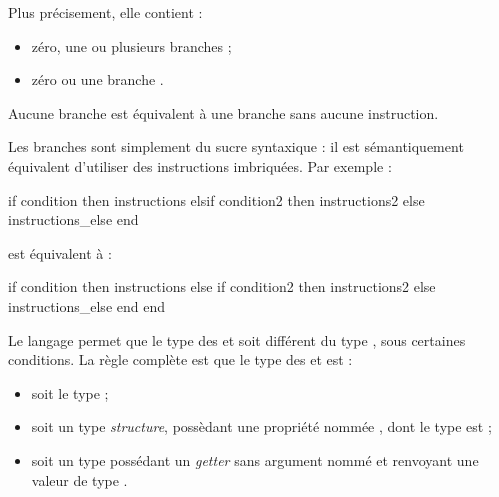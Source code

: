 {Plus précisement, elle contient :
\begin{itemize}
\item zéro, une ou plusieurs branches  ;
\item zéro ou une branche .
\end{itemize}


Aucune branche  est équivalent à une branche  sans aucune instruction.


Les branches  sont simplement du sucre syntaxique : il est sémantiquement équivalent d'utiliser des instructions  imbriquées. Par exemple :
{
\begin{galgascode}
if condition then
  instructions
elsif condition2 then
  instructions2
else
  instructions_else
end
\end{galgascode}
}
est équivalent à :
{
\begin{galgascode}
if condition then
  instructions
else
  if condition2 then
    instructions2
  else
    instructions_else
  end
end
\end{galgascode}
}


{
Le langage permet que le type des  et  soit différent du type , sous certaines conditions. La règle complète est que le type des  et  est :
\begin{itemize}
\item soit le type  ;
\item soit un type \emph{structure}, possèdant une propriété nommée , dont le type est ; 
\item soit un type possédant un \emph{getter} sans argument nommé  et renvoyant une valeur de type .
\end{itemize}

}}
